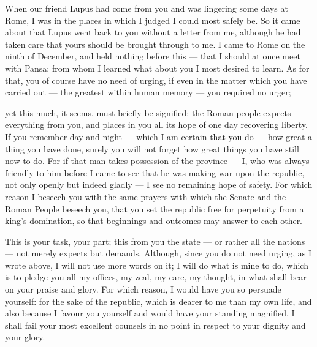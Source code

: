 

 When our friend Lupus had come from you and was lingering some days at Rome, I was in the places in which I judged I could most safely be. So it came about that Lupus went back to you without a letter from me, although he had taken care that yours should be brought through to me. I came to Rome on the ninth of December, and held nothing before this --- that I should at once meet with Pansa; from whom I learned what about you I most desired to learn. As for that, you of course have no need of urging, if even in the matter which you have carried out --- the greatest within human memory --- you required no urger;

 yet this much, it seems, must briefly be signified: the Roman people expects everything from you, and places in you all its hope of one day recovering liberty. If you remember day and night --- which I am certain that you do --- how great a thing you have done, surely you will not forget how great things you have still now to do. For if that man takes possession of the province --- I, who was always friendly to him before I came to see that he was making war upon the republic, not only openly but indeed gladly --- I see no remaining hope of safety. For which reason I beseech you with the same prayers with which the Senate and the Roman People beseech you, that you set the republic free for perpetuity from a king's domination, so that beginnings and outcomes may answer to each other.

 This is your task, your part; this from you the state --- or rather all the nations --- not merely expects but demands. Although, since you do not need urging, as I wrote above, I will not use more words on it; I will do what is mine to do, which is to pledge you all my offices, my zeal, my care, my thought, in what shall bear on your praise and glory. For which reason, I would have you so persuade yourself: for the sake of the republic, which is dearer to me than my own life, and also because I favour you yourself and would have your standing magnified, I shall fail your most excellent counsels in no point in respect to your dignity and your glory.
